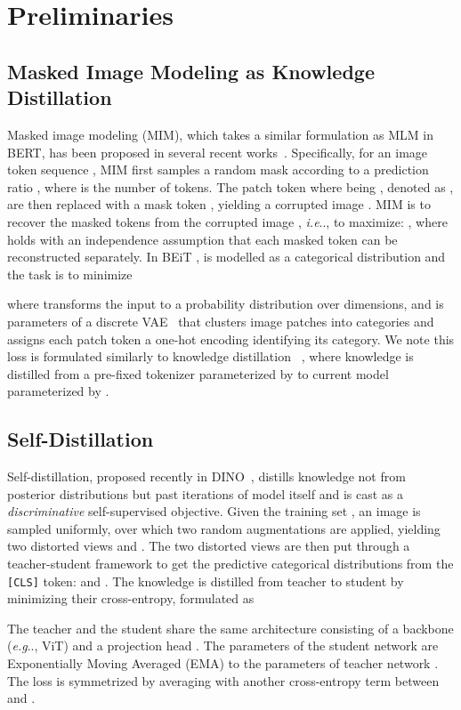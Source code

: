 \documentclass{article} \usepackage{iclr2022_conference,times}
\makeatletter
\DeclareRobustCommand\onedot{\futurelet\@let@token\@onedot}
\def\@onedot{\ifx\@let@token.\else.\null\fi\xspace}
\def\eg{\emph{e.g}\onedot} \def\Eg{\emph{E.g}\onedot}
\def\ie{\emph{i.e}\onedot} \def\Ie{\emph{I.e}\onedot}
\makeatother
\begin{document}
\section{Preliminaries}

\subsection{Masked Image Modeling as Knowledge Distillation}

Masked image modeling (MIM), which takes a similar formulation as MLM in BERT, has been proposed in several recent works~\citep{beit, vimpac}. Specifically, for an image token sequence , MIM first samples a random mask  according to a prediction ratio , where  is the number of tokens. The patch token  where  being , denoted as , are then replaced with a mask token , yielding a corrupted image . MIM is to recover the masked tokens   from the corrupted image , \ie, to maximize: ,
where  holds with an independence assumption that each masked token can be reconstructed separately.
In BEiT \citep{beit},  is modelled as a categorical distribution and the task is to minimize

where  transforms the input to a probability distribution over  dimensions, and  is parameters of a discrete VAE~\citep{dalle} that clusters image patches into  categories and assigns each patch token a one-hot encoding identifying its category.
We note this loss is formulated similarly to knowledge distillation ~\citep{distill}, where knowledge is distilled from a pre-fixed tokenizer parameterized by  to current model parameterized by .

\subsection{Self-Distillation}

Self-distillation, proposed recently in DINO~\citep{dino}, distills knowledge not from posterior distributions  
but past iterations of model itself  and is cast as a \textit{discriminative} self-supervised objective.
Given the training set , an image  is sampled uniformly, over which two random augmentations are applied, yielding two distorted views  and . The two distorted views are then put through a teacher-student framework to get the predictive categorical distributions from the \texttt{[CLS]} token:   and . The knowledge is distilled from teacher to student by minimizing their cross-entropy, formulated as

The teacher and the student share the same architecture consisting of a backbone  (\eg, ViT) and a projection head . The parameters of the student network  are Exponentially Moving Averaged (EMA) to the parameters of teacher network . 
The loss is symmetrized by averaging with another cross-entropy term between  and .
\end{document}
